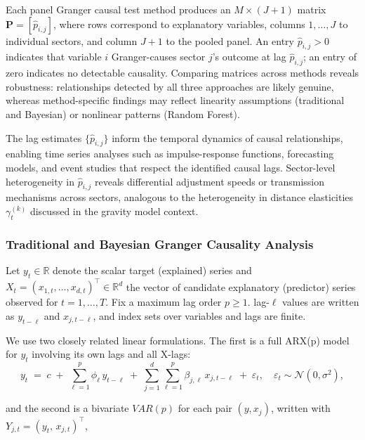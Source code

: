 \documentclass[preprint, 3p,
authoryear]{elsarticle} %
\begin{document}
Each panel Granger causal test method produces an \(M \times (J+1)\)
matrix \(\mathbf{P} = [\widehat{p}_{i,j}]\), where rows correspond to
explanatory variables, columns \(1,\ldots,J\) to individual sectors, and
column \(J+1\) to the pooled panel. An entry \(\widehat{p}_{i,j} > 0\)
indicates that variable \(i\) Granger-causes sector \(j\)'s outcome at
lag \(\widehat{p}_{i,j}\); an entry of zero indicates no detectable
causality. Comparing matrices across methods reveals robustness:
relationships detected by all three approaches are likely genuine,
whereas method-specific findings may reflect linearity assumptions
(traditional and Bayesian) or nonlinear patterns (Random Forest).

The lag estimates \(\{\widehat{p}_{i,j}\}\) inform the temporal dynamics
of causal relationships, enabling time series analyses such as
impulse-response functions, forecasting models, and event studies that
respect the identified causal lags. Sector-level heterogeneity in
\(\widehat{p}_{i,j}\) reveals differential adjustment speeds or
transmission mechanisms across sectors, analogous to the heterogeneity
in distance elasticities \(\gamma_t^{(k)}\) discussed in the gravity
model context.

\subsubsection{Traditional and Bayesian Granger Causality
Analysis}\label{sec:tradgc}

Let \(y_t \in \mathbb{R}\) denote the scalar target (explained) series
and \(X_t=(x_{1,t},\dots,x_{d,t})^\top \in \mathbb{R}^d\) the vector of
candidate explanatory (predictor) series observed for \(t=1,\dots,T\).
Fix a maximum lag order \(p\ge 1\). lag-\(\ell\) values are written as
\(y_{t-\ell}\) and \(x_{j,t-\ell}\), and index sets over variables and
lags are finite.

We use two closely related linear formulations. The first is a full
ARX(p) model for \(y_t\) involving its own lags and all X-lags:
\begin{equation}
y_t \;=\; c \;+\; \sum_{\ell=1}^{p}\phi_{\ell}\,y_{t-\ell} \;+\; \sum_{j=1}^{d}\sum_{\ell=1}^{p}\beta_{j,\ell}\,x_{j,t-\ell} \;+\; \varepsilon_t,\quad \varepsilon_t\sim \mathcal{N}(0,\sigma^2),
\label{eq:arx}
\end{equation}

and the second is a bivariate \(VAR(p)\) for each pair \((y,x_j)\),
written with \(Y_{j,t}=(y_t,\,x_{j,t})^\top\),
\end{document}
